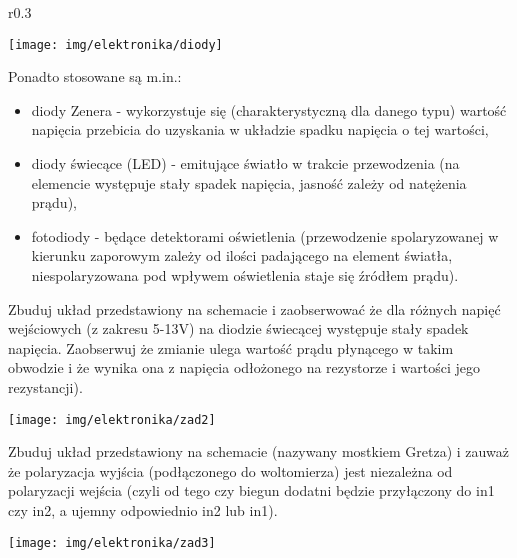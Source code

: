 \documentclass{pdfBooklets}
\begin{document}
\begin{wrapfigure}{r}{0.3\textwidth}
  \begin{center}
    \texttt{[image: img/elektronika/diody]}
  \end{center}
\end{wrapfigure}
Ponadto stosowane są m.in.:
\begin{itemize}
\item diody Zenera - wykorzystuje się (charakterystyczną dla danego typu) wartość napięcia przebicia do uzyskania w układzie spadku napięcia o tej wartości,
\item diody świecące (LED) - emitujące światło w trakcie przewodzenia (na elemencie występuje stały spadek napięcia, jasność zależy od natężenia prądu),
\item fotodiody - będące detektorami oświetlenia (przewodzenie spolaryzowanej w kierunku zaporowym zależy od ilości padającego na element światła, niespolaryzowana pod wpływem oświetlenia staje się źródłem prądu).
\end{itemize}

\begin{Zadanie}{}{}
\noindent\begin{minipage}[b]{0.7\textwidth}
Zbuduj układ przedstawiony na schemacie i zaobserwować że dla różnych napięć wejściowych (z zakresu 5-13V) na diodzie świecącej występuje stały spadek napięcia.
Zaobserwuj że zmianie ulega wartość prądu płynącego w takim obwodzie i że wynika ona z napięcia odłożonego na rezystorze i wartości jego rezystancji).
\end{minipage}
\hfill
\begin{minipage}[b]{0.25\textwidth}
\texttt{[image: img/elektronika/zad2]}\vspace{0.5cm}
\end{minipage}
\end{Zadanie}


\begin{Zadanie}{}{}
\noindent\begin{minipage}[b]{0.6\textwidth}
Zbuduj układ przedstawiony na schemacie (nazywany mostkiem Gretza) i zauważ że polaryzacja wyjścia (podłączonego do woltomierza) jest niezależna od polaryzacji wejścia (czyli od tego czy biegun dodatni będzie przyłączony do in1 czy in2, a ujemny odpowiednio in2 lub in1).
\end{minipage}
\hfill
\begin{minipage}[b]{0.35\textwidth}
\texttt{[image: img/elektronika/zad3]}
\end{minipage}
\end{Zadanie}
\end{document}

